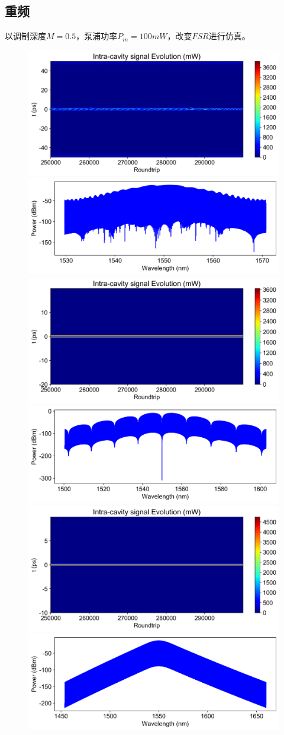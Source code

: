 \subsection{重频}
以调制深度$M = 0.5$，泵浦功率$P_{in} = 100mW$，改变$FSR$进行仿真。\\
\begin{figure}[htbp]
    \centering
    \includegraphics[width=0.48\linewidth]{figure/fig_21.png}
    \includegraphics[width=0.48\linewidth]{figure/fig_21_0.png}
    \includegraphics[width=0.48\linewidth]{figure/fig_22.png}
    \includegraphics[width=0.48\linewidth]{figure/fig_22_0.png}
    \includegraphics[width=0.48\linewidth]{figure/fig_23.png}
    \includegraphics[width=0.48\linewidth]{figure/fig_23_0.png}

\end{figure}
